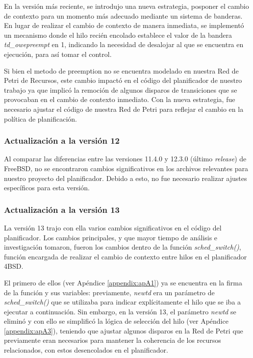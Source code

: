 En la versión más reciente, se introdujo una nueva estrategia, posponer el cambio de contexto para un momento más adecuado mediante un sistema de banderas. En lugar de realizar el cambio de contexto de manera inmediata, se implementó un mecanismo donde el hilo recién encolado establece el valor de la bandera \textit{td\_owepreempt} en 1, indicando la necesidad de desalojar al que se encuentra en ejecución, para así tomar el control.\par

Si bien el metodo de preemption no se encuentra modelado en nuestra Red de Petri de Recursos, este cambio impactó en el código del planificador de nuestro trabajo ya que implicó la remoción de algunos disparos de transiciones que se provocaban en el cambio de contexto inmediato. Con la nueva estrategia, fue necesario ajustar el código de nuestra Red de Petri para reflejar el cambio en la política de planificación.\par

\subsubsection{Actualización a la versión 12}

Al comparar las diferencias entre las versiones 11.4.0 y 12.3.0 (último \textit{release}) de FreeBSD, no se encontraron cambios significativos en los archivos relevantes para nuestro proyecto del planificador. Debido a esto, no fue necesario realizar ajustes específicos para esta versión.


\subsubsection{Actualización a la versión 13}

La versión 13 trajo con ella varios cambios significativos en el código del planificador. Los cambios principales, y que mayor tiempo de análisis e investigación tomaron, fueron los cambios dentro de la función \textit{sched\_switch()}, función encargada de realizar el cambio de contexto entre hilos en el planificador 4BSD.\par

El primero de ellos (ver Apéndice \ref{appendix:apA1}) ya se encuentra en la firma de la función y sus variables: previamente, \textit{newtd} era un parámetro de \textit{sched\_switch()} que se utilizaba para indicar explícitamente el hilo que se iba a ejecutar a continuación. Sin embargo, en la versión 13, el parámetro \textit{newtd} se eliminó y con ello se simplificó la lógica de selección del hilo (ver Apéndice \ref{appendix:apA3}), teniendo que ajustar algunos disparos en la Red de Petri que previamente eran necesarios para mantener la coherencia de los recursos relacionados, con estos desencolados en el planificador.\par

